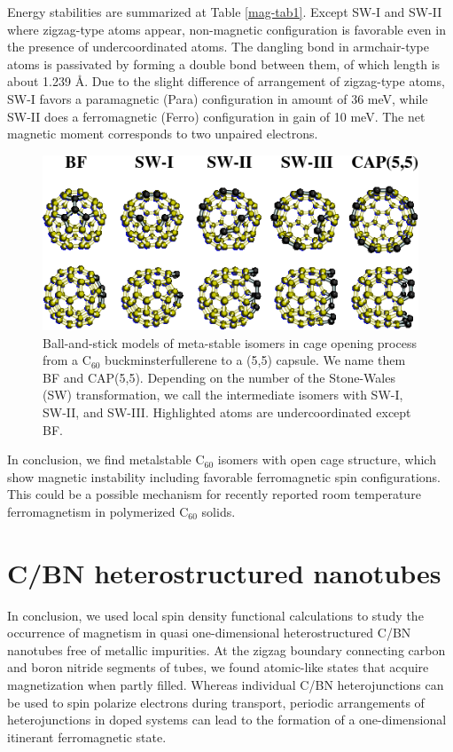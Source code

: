 \documentclass[doctor,english,final]{kaist-ucs}
\begin{document}
Energy stabilities are summarized at Table \ref{mag-tab1}.
Except SW-I and SW-II where zigzag-type atoms appear, non-magnetic configuration
is favorable even in the presence of undercoordinated atoms.
The dangling bond in armchair-type atoms is passivated by forming a double
bond between them, of which length is about 1.239 {\AA}.
Due to the slight difference of arrangement of zigzag-type atoms, SW-I
favors a paramagnetic (Para) configuration in amount of 36 meV,
while SW-II does a ferromagnetic (Ferro) configuration in gain of 10 meV.
The net magnetic moment corresponds to two unpaired electrons.


\begin{figure}[t]
    \centerline{\includegraphics[width=12.5cm]{sample-fig1}}
    \caption{ Ball-and-stick models of meta-stable isomers in
        cage opening process from a C$_{60}$ buckminsterfullerene
        to a (5,5) capsule. We name them BF and CAP(5,5).
        Depending on the number of the Stone-Wales (SW) transformation,
        we call the intermediate isomers with SW-I, SW-II, and SW-III.
        Highlighted atoms are undercoordinated except BF.
    } \label{mag-fig1}
\end{figure}


In conclusion, we find metalstable C$_{60}$ isomers with open cage structure,
which show magnetic instability including favorable ferromagnetic spin configurations.
This could be a possible mechanism for recently reported room temperature ferromagnetism
in polymerized C$_{60}$ solids.


\section{C/BN heterostructured nanotubes}

In conclusion, we used local spin density functional calculations
to study the occurrence of magnetism in quasi one-dimensional
heterostructured C/BN nanotubes free of metallic impurities. At
the zigzag boundary connecting carbon and boron nitride segments
of tubes, we found atomic-like states that acquire magnetization
when partly filled. Whereas individual C/BN heterojunctions can
be used to spin polarize electrons during transport, periodic
arrangements of heterojunctions in doped systems can lead to the
formation of a one-dimensional itinerant ferromagnetic state.
\end{document}
